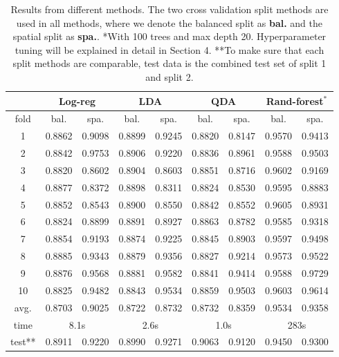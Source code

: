 \documentclass[letterpaper,11pt]{article}
\begin{document}
\begin{table}[!hbt]
\centering
\begin{tabular}{|c|c|c|c|c|c|c|c|c|} \hline
             & \multicolumn{2}{c}{Log-reg} \vline &  \multicolumn{2}{c}{LDA} \vline& \multicolumn{2}{c}{QDA} \vline & \multicolumn{2}{c}{Rand-forest$^*$}\vline \\\hline
fold & bal. & spa. & bal. & spa. & bal. & spa. & bal. & spa.       \\ \hline
1 & 0.8862 & 0.9098 & 0.8899 & 0.9245 & 0.8820 & 0.8147 & 0.9570 & 0.9413 \\
2 & 0.8842 & 0.9753 & 0.8906 & 0.9220 & 0.8836 & 0.8961 & 0.9588 & 0.9503\\
3 & 0.8820 & 0.8602 & 0.8904 & 0.8603 & 0.8851 & 0.8716 & 0.9602 & 0.9169\\
4 & 0.8877 & 0.8372 & 0.8898 & 0.8311 & 0.8824 & 0.8530 & 0.9595 & 0.8883\\
5 & 0.8852 & 0.8543 & 0.8900 & 0.8550 & 0.8842 & 0.8552 & 0.9605 & 0.8931\\
6 & 0.8824 & 0.8899 & 0.8891 & 0.8927 & 0.8863 & 0.8782 & 0.9585 & 0.9318 \\
7 & 0.8854 & 0.9193 & 0.8874 & 0.9225 & 0.8845 & 0.8903 & 0.9597 & 0.9498 \\
8 & 0.8885 & 0.9343 & 0.8879 & 0.9356 & 0.8827 & 0.9214 & 0.9573 & 0.9522 \\
9 & 0.8876 & 0.9568 & 0.8881 & 0.9582 & 0.8841 & 0.9414 & 0.9588 & 0.9729\\
10 & 0.8825 & 0.9482 & 0.8843 & 0.9534 & 0.8859 & 0.9503 & 0.9603 & 0.9614\\ \hline
avg. & 0.8703 & 0.9025 & 0.8722 & 0.8732 & 0.8732 & 0.8359 & 0.9534 & 0.9358\\ \hline
time & \multicolumn{2}{c}{8.1s} \vline & \multicolumn{2}{c}{2.6s} \vline            &   \multicolumn{2}{c}{1.0s} \vline & \multicolumn{2}{c}{283s} \vline \\\hline
test** & 0.8911 & 0.9220 & 0.8990 & 0.9271 & 0.9063 & 0.9120 & 0.9450 & 0.9300 \\\hline
\end{tabular}
    \caption{Results from different methods. The two cross validation split methods are used in all methods, where we denote the balanced split as \textbf{bal.} and the spatial split as \textbf{spa.}. *With 100 trees and max depth 20. Hyperparameter tuning will be explained in detail in Section 4. **To make sure that each split methods are comparable, test data is the combined test set of split 1 and split 2.}
    \label{tab:result}
\end{table}
\end{document}
